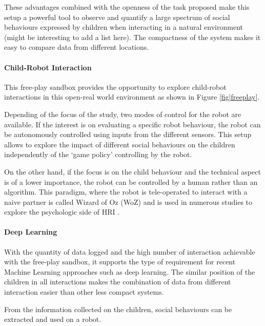 \documentclass[sigconf]{acmart}
\begin{document}
These advantages combined with the openness of the task proposed make this setup a powerful tool to observe and quantify a large spectrum of social behaviours expressed by children when interacting in a natural environment (might be interesting to add a list here). The compactness of the system makes it easy to compare data from different locations.

\paragraph{Child-Robot Interaction}
\label{ssec|CRI}
This free-play sandbox provides the opportunity to explore child-robot
interactions in this open-real world environment as shown in Figure
\ref{fig|freeplay}. 

Depending of the focus of the study, two modes of control for the robot are
available. If the interest is on evaluating a specific robot behaviour, the
robot can be autonomously controlled using inputs from the different sensors.
This setup allows to explore the impact of different social behaviours on the
children independently of the `game policy' controlling by the robot. 

On the other hand, if the focus is on the child behaviour and the technical
aspect is of a lower importance, the robot can be controlled by a human rather
than an algorithm. This paradigm, where the robot is tele-operated to interact
with a naive partner is called Wizard of Oz (WoZ) and is used in numerous
studies to explore the psychologic side of HRI \cite{riek2012wizard}. 

\paragraph{Deep Learning}

With the quantity of data logged and the high number of interaction achievable
with the free-play sandbox, it supports the type of requirement for recent
Machine Learning approaches such as deep learning. The similar position of the
children in all interactions makes the combination of data from different
interaction easier than other less compact systems.

From the information collected on the children, social behaviours can be
extracted and used on a robot.

\end{document}
